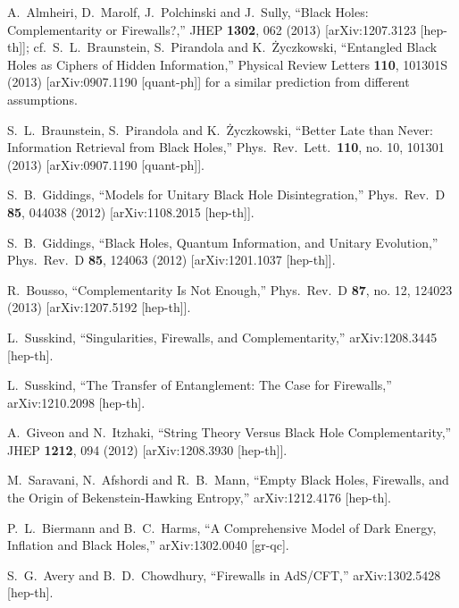 \documentclass[12pt]{article}
\begin{document}
\begin{thebibliography}{99}

  A.~Almheiri, D.~Marolf, J.~Polchinski and J.~Sully,
  ``Black Holes: Complementarity or Firewalls?,''
  JHEP {\bf 1302}, 062 (2013)
  [arXiv:1207.3123 [hep-th]];
  cf.\ S.~L.~Braunstein, S.~Pirandola and K.~\.{Z}yczkowski,
  ``Entangled Black Holes as Ciphers of Hidden Information,''
  Physical Review Letters {\bf 110}, 101301S (2013)
  [arXiv:0907.1190 [quant-ph]]
  for a similar prediction from different assumptions.

  S.~L.~Braunstein, S.~Pirandola and K.~\.{Z}yczkowski,
  ``Better Late than Never: Information Retrieval from Black Holes,''
  Phys.\ Rev.\ Lett.\  {\bf 110}, no. 10, 101301 (2013)
  [arXiv:0907.1190 [quant-ph]].
    
  S.~B.~Giddings,
  ``Models for Unitary Black Hole Disintegration,''
  Phys.\ Rev.\ D {\bf 85}, 044038 (2012)
  [arXiv:1108.2015 [hep-th]].
  
  S.~B.~Giddings,
  ``Black Holes, Quantum Information, and Unitary Evolution,''
  Phys.\ Rev.\ D {\bf 85}, 124063 (2012)
  [arXiv:1201.1037 [hep-th]].

  R.~Bousso,
  ``Complementarity Is Not Enough,''
  Phys.\ Rev.\ D {\bf 87}, no. 12, 124023 (2013)
  [arXiv:1207.5192 [hep-th]].
    
  L.~Susskind,
  ``Singularities, Firewalls, and Complementarity,''
  arXiv:1208.3445 [hep-th]. 
  
  L.~Susskind,
  ``The Transfer of Entanglement: The Case for Firewalls,''
  arXiv:1210.2098 [hep-th]. 

  A.~Giveon and N.~Itzhaki,
  ``String Theory Versus Black Hole Complementarity,''
  JHEP {\bf 1212}, 094 (2012)
  [arXiv:1208.3930 [hep-th]].  

  M.~Saravani, N.~Afshordi and R.~B.~Mann,
  ``Empty Black Holes, Firewalls, and the Origin of Bekenstein-Hawking Entropy,''
  arXiv:1212.4176 [hep-th].

  P.~L.~Biermann and B.~C.~Harms,
  ``A Comprehensive Model of Dark Energy, Inflation and Black Holes,''
  arXiv:1302.0040 [gr-qc].

  S.~G.~Avery and B.~D.~Chowdhury,
  ``Firewalls in AdS/CFT,''
  arXiv:1302.5428 [hep-th].


\end{thebibliography}
\end{document}
